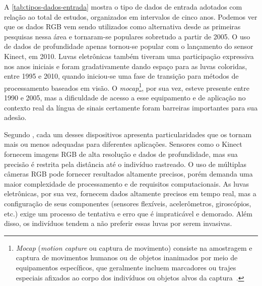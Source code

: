 A \autoref{tab:tipos-dados-entrada} mostra o tipo de dados de entrada adotados com relação ao total de estudos, organizados em intervalos de cinco anos. Podemos ver que os dados RGB vem sendo utilizados como alternativa desde as primeiras pesquisas nessa área e tornaram-se populares sobretudo a partir de 2005. O uso de dados de profundidade apenas tornou-se popular com o lançamento do sensor Kinect, em 2010. Luvas eletrônicas também tiveram uma participação expressiva nos anos iniciais e foram gradativamente dando espaço para as luvas coloridas, entre 1995 e 2010, quando iniciou-se uma fase de transição para métodos de processamento baseados em visão. O \textit{mocap}\footnote{
    \textit{Mocap} (\textit{motion capture} ou captura de movimento) consiste na amostragem e captura de movimentos humanos ou de objetos inanimados por meio de equipamentos específicos, que geralmente incluem marcadores ou trajes especiais afixados ao corpo dos indivíduos ou objetos alvos da captura~\cite{kitagawa-2017-mocap}.
}, por sua vez, esteve presente entre 1990 e 2005, mas a dificuldade de acesso a esse equipamento e de aplicação no contexto real da língua de sinais certamente foram barreiras importantes para sua adesão.




Segundo , cada um desses dispositivos apresenta particularidades que os tornam mais ou menos adequadas para diferentes aplicações. Sensores como o Kinect fornecem imagens RGB de alta resolução e dados de profundidade, mas sua precisão é restrita pela distância até o indivíduo rastreado. O uso de múltiplas câmeras RGB pode fornecer resultados altamente precisos, porém demanda uma maior complexidade de processamento e de requisitos computacionais. As luvas eletrônicas, por sua vez, fornecem dados altamente precisos em tempo real, mas a configuração de seus componentes (sensores flexíveis, acelerômetros, giroscópios, etc.) exige um processo de tentativa e erro que é impraticável e demorado. Além disso, os indivíduos tendem a não preferir essas luvas por serem invasivas.




